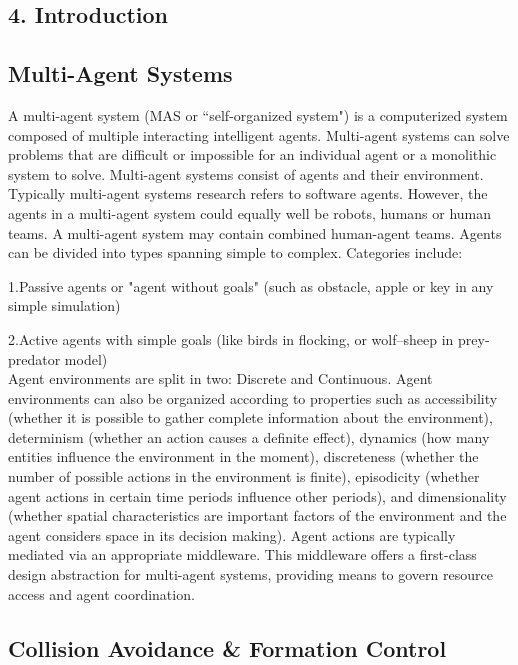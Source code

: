 \documentclass[12pt]{report}
\begin{document}
\begin{center}
\chapter*{4.  Introduction}
\end{center}

\setcounter{chapter}{4}
\section{Multi-Agent Systems}
A multi-agent system (MAS or ``self-organized system") is a computerized system composed of multiple interacting intelligent agents. Multi-agent systems can solve problems that are difficult or impossible for an individual agent or a monolithic system to solve. 
Multi-agent systems consist of agents and their environment. Typically multi-agent systems research refers to software agents. However, the agents in a multi-agent system could equally well be robots, humans or human teams. A multi-agent system may contain combined human-agent teams. Agents can be divided into types spanning simple to complex. Categories include:

		1.Passive agents or "agent without goals" (such as obstacle, apple or key in any simple simulation)
		
    	2.Active agents with simple goals (like birds in flocking, or wolf–sheep in prey-predator model)\\
    	
Agent environments are split in two: Discrete and Continuous. Agent environments can also be organized according to properties such as accessibility (whether it is possible to gather complete information about the environment), determinism (whether an action causes a definite effect), dynamics (how many entities influence the environment in the moment), discreteness (whether the number of possible actions in the environment is finite), episodicity (whether agent actions in certain time periods influence other periods), and dimensionality (whether spatial characteristics are important factors of the environment and the agent considers space in its decision making). Agent actions are typically mediated via an appropriate middleware. This middleware offers a first-class design abstraction for multi-agent systems, providing means to govern resource access and agent coordination.

\newpage
\section{Collision Avoidance \& Formation Control}
\end{document}
